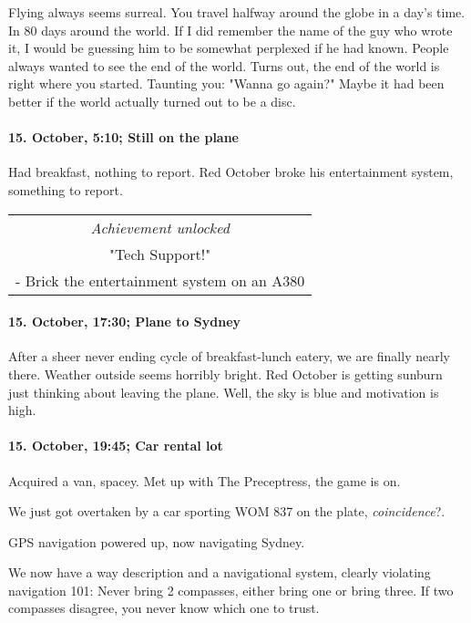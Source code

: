 Flying always seems surreal.
You travel halfway around the globe in a day's time.
In 80 days around the world.
If I did remember the name of the guy who wrote it, I would be guessing him to be somewhat perplexed if he had known.
People always wanted to see the end of the world.
Turns out, the end of the world is right where you started.
Taunting you: "Wanna go again?"
Maybe it had been better if the world actually turned out to be a disc.

\paragraph{15. October, 5:10; Still on the plane}
Had breakfast, nothing to report.
Red October broke his entertainment system, something to report.

\begin{center}
\begin{tabular}{||c||}
\emph{Achievement unlocked}\\
"Tech Support!"\\
\multicolumn{1}{||p{0.8\textwidth}||}{\footnotesize - Brick the entertainment system on an A380} \\
\end{tabular}
\end{center}

\paragraph{15. October, 17:30; Plane to Sydney}
After a sheer never ending cycle of breakfast-lunch eatery, we are finally nearly there.
Weather outside seems horribly bright.
Red October is getting sunburn just thinking about leaving the plane.
Well, the sky is blue and motivation is high.

\paragraph{15. October, 19:45; Car rental lot}
Acquired a van, spacey.
Met up with The Preceptress, the game is on.

We just got overtaken by a car sporting WOM 837 on the plate, \emph{coincidence}?.

GPS navigation powered up, now navigating Sydney.

We now have a way description and a navigational system, clearly violating navigation 101: Never bring 2 compasses, either bring one or bring three.
If two compasses disagree, you never know which one to trust.


